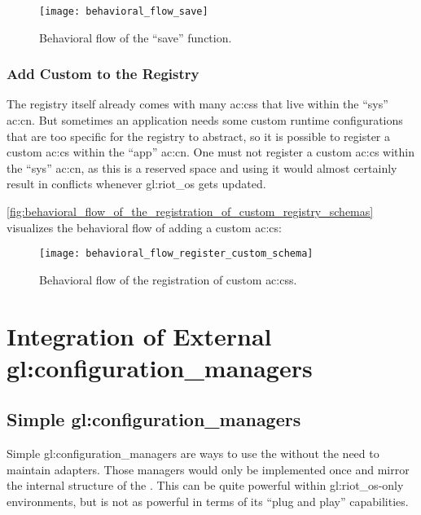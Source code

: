 \begin{figure}[H]
    \centering
    \texttt{[image: behavioral\_flow\_save]}
    \caption{Behavioral flow of the ``save'' function.}
    \label{fig:behavioral_flow_of_the_save_api}
\end{figure}

\subsubsection{Add Custom  to the Registry}

The registry itself already comes with many \glspl{ac:cs} that live within the ``sys'' \gls{ac:cn}.
But sometimes an application needs some custom runtime configurations that are too specific for the registry to abstract, so it is possible to register a custom \gls{ac:cs} within the ``app'' \gls{ac:cn}.
One must not register a custom \gls{ac:cs} within the ``sys'' \gls{ac:cn}, as this is a reserved space and using it would almost certainly result in conflicts whenever \gls{gl:riot_os} gets updated.

\autoref{fig:behavioral_flow_of_the_registration_of_custom_registry_schemas} visualizes the behavioral flow of adding a custom \gls{ac:cs}:

\begin{figure}[H]
    \centering
    \texttt{[image: behavioral\_flow\_register\_custom\_schema]}
    \caption{Behavioral flow of the registration of custom \gls{ac:cs}s.}
    \label{fig:behavioral_flow_of_the_registration_of_custom_registry_schemas}
\end{figure}

\section{Integration of External \glspl*{gl:configuration_manager}}
\label{sec:design:integrating_external_configuration_managers}

\subsection{Simple \glspl*{gl:configuration_manager}}
\label{sec:design:integrating_external_configuration_managers:simple_configuration_managers}

Simple \glspl{gl:configuration_manager} are ways to use the  without the need to maintain adapters.
Those managers would only be implemented once and mirror the internal structure of the .
This can be quite powerful within \gls{gl:riot_os}-only environments, but is not as powerful in terms of its ``plug and play'' capabilities.

